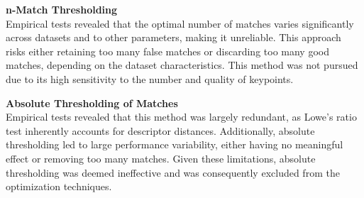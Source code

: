\textbf{n-Match Thresholding} \\
Empirical tests revealed that the optimal number of matches varies significantly across datasets and to other parameters, making it unreliable. This approach risks either retaining too many false matches or discarding too many good matches, depending on the dataset characteristics. This method was not pursued due to its high sensitivity to the number and quality of keypoints. 

\textbf{Absolute Thresholding of Matches} \\
 Empirical tests revealed that this method was largely redundant, as Lowe's ratio test inherently accounts for descriptor distances. Additionally, absolute thresholding led to large performance variability, either having no meaningful effect or removing too many matches. Given these limitations, absolute thresholding was deemed ineffective and was consequently excluded from the optimization techniques.

